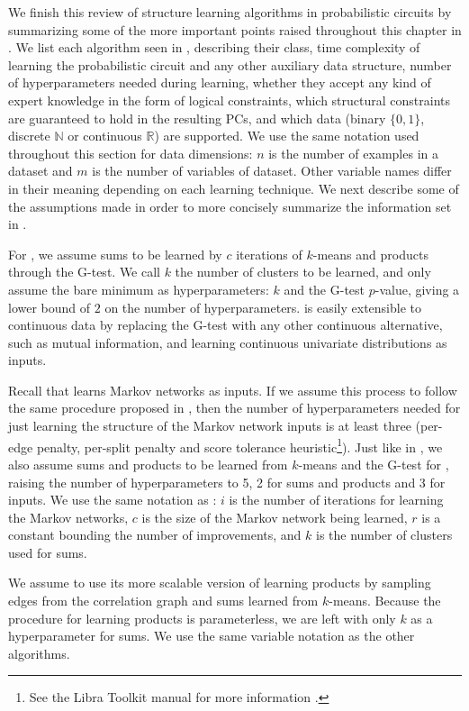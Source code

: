 We finish this review of structure learning algorithms in probabilistic circuits by summarizing
some of the more important points raised throughout this chapter in . We list
each algorithm seen in , describing their class, time complexity of learning the
probabilistic circuit and any other auxiliary data structure, number of hyperparameters needed
during learning, whether they accept any kind of expert knowledge in the form of logical
constraints, which structural constraints are guaranteed to hold in the resulting PCs, and
which data (binary $\{0,1\}$, discrete $\mathbb{N}$ or continuous $\mathbb{R}$) are supported. We
use the same notation used throughout this section for data dimensions: $n$ is the number of
examples in a dataset and $m$ is the number of variables of dataset. Other variable names differ in
their meaning depending on each learning technique. We next describe some of the assumptions made
in order to more concisely summarize the information set in .

For , we assume sums to be learned by $c$ iterations of $k$-means and products
through the G-test. We call $k$ the number of clusters to be learned, and only assume the bare
minimum as hyperparameters: $k$ and the G-test $p$-value, giving a lower bound of $2$ on the number
of hyperparameters.  is easily extensible to continuous data by replacing the
G-test with any other continuous alternative, such as mutual information, and learning continuous
univariate distributions as inputs.

Recall that  learns Markov networks as inputs. If we assume this process to follow
the same procedure proposed in \citet{rooshenas14}, then the number of hyperparameters needed for
just learning the structure of the Markov network inputs is at least three (per-edge penalty,
per-split penalty and score tolerance heuristic\footnote{See the Libra Toolkit manual for more
information \citep{libra}.}). Just like in , we also assume sums and products to
be learned from $k$-means and the G-test for , raising the number of
hyperparameters to 5, 2 for sums and products and 3 for inputs. We use the same notation as
: $i$ is the number of iterations for learning the Markov networks, $c$ is the size
of the Markov network being learned, $r$ is a constant bounding the number of improvements, and $k$
is the number of clusters used for sums.

We assume  to use its more scalable version of learning products by sampling
edges from the correlation graph and sums learned from $k$-means. Because the procedure for
learning products is parameterless, we are left with only $k$ as a hyperparameter for sums. We use
the same variable notation as the other \divclass{} algorithms.

